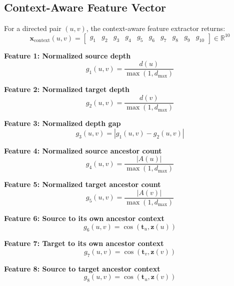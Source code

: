 \documentclass[11pt,a4paper]{article}
\begin{document}
\subsection{Context-Aware Feature Vector}
For a directed pair \((u,v)\), the context-aware feature extractor returns:
\begin{equation}
\mathbf{x}_{\text{context}}(u,v) =
\begin{bmatrix}
g_1 & g_2 & g_3 & g_4 & g_5 & g_6 & g_7 & g_8 & g_9 & g_{10}
\end{bmatrix}
\in \mathbb{R}^{10}
\end{equation}

\textbf{Feature 1: Normalized source depth}
\begin{equation}
g_1(u,v) = \frac{d(u)}{\max(1,d_{\max})}
\end{equation}

\textbf{Feature 2: Normalized target depth}
\begin{equation}
g_2(u,v) = \frac{d(v)}{\max(1,d_{\max})}
\end{equation}

\textbf{Feature 3: Normalized depth gap}
\begin{equation}
g_3(u,v) = \left| g_1(u,v) - g_2(u,v) \right|
\end{equation}

\textbf{Feature 4: Normalized source ancestor count}
\begin{equation}
g_4(u,v) = \frac{|A(u)|}{\max(1,d_{\max})}
\end{equation}

\textbf{Feature 5: Normalized target ancestor count}
\begin{equation}
g_5(u,v) = \frac{|A(v)|}{\max(1,d_{\max})}
\end{equation}

\textbf{Feature 6: Source to its own ancestor context}
\begin{equation}
g_6(u,v) = \cos(\mathbf{t}_u, \mathbf{z}(u))
\end{equation}

\textbf{Feature 7: Target to its own ancestor context}
\begin{equation}
g_7(u,v) = \cos(\mathbf{t}_v, \mathbf{z}(v))
\end{equation}

\textbf{Feature 8: Source to target ancestor context}
\begin{equation}
g_8(u,v) = \cos(\mathbf{t}_u, \mathbf{z}(v))
\end{equation}
\end{document}

